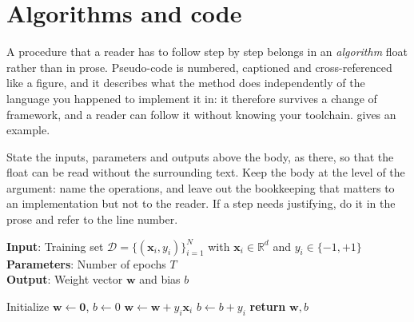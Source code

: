\section{Algorithms and code}
\label{sec:algorithms}

%
%
%
%

A procedure that a reader has to follow step by step belongs in an
\emph{algorithm} float rather than in prose. Pseudo-code is numbered,
captioned and cross-referenced like a figure, and it describes what the method
does independently of the language you happened to implement it in: it
therefore survives a change of framework, and a reader can follow it without
knowing your toolchain.  gives an example.

State the inputs, parameters and outputs above the body, as there, so that the
float can be read without the surrounding text. Keep the body at the level of
the argument: name the operations, and leave out the bookkeeping that matters
to an implementation but not to the reader. If a step needs justifying, do it
in the prose and refer to the line number.

\begin{algorithm}[tb]
\small
\caption{Perceptron learning algorithm \parencite{rosenblatt1958perceptron}}
\label{alg:perceptron}
\textbf{Input}: Training set $\mathcal{D} = \{(\bm{x}_i, y_i)\}_{i=1}^{N}$ with $\bm{x}_i \in \mathbb{R}^d$ and $y_i \in \{-1, +1\}$\\
\textbf{Parameters}: Number of epochs $T$\\
\textbf{Output}: Weight vector $\bm{w}$ and bias $b$\\
\begin{algorithmic}[1] %
\STATE Initialize $\bm{w} \leftarrow \bm{0}$, $b \leftarrow 0$
\STATE $\bm{w} \leftarrow \bm{w} + y_i \bm{x}_i$
\STATE $b \leftarrow b + y_i$
\ENDIF
\ENDFOR
\ENDFOR
\STATE \textbf{return} $\bm{w}, b$
\end{algorithmic}
\end{algorithm}

